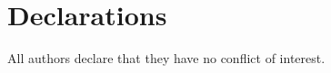 \documentclass[pdflatex,sn-mathphys-num]{sn-jnl}%
\theoremstyle{thmstyleone}%
\theoremstyle{thmstyletwo}%
\theoremstyle{thmstylethree}%
\begin{document}
\section*{Declarations}

All authors declare that they have no conflict of interest. 


\end{document}
